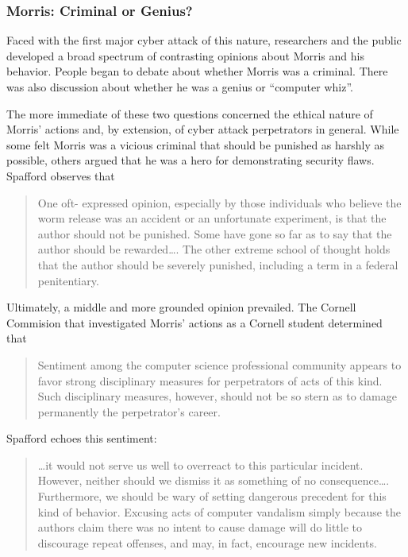 \subsubsection*{Morris: Criminal or Genius?}
Faced with the first major cyber attack of this nature, researchers and the
public developed a broad spectrum of contrasting opinions about Morris and his
behavior. People began to debate about whether Morris was a criminal.
There was also discussion about whether he was a genius or ``computer whiz''. 

The more immediate of these two questions concerned the ethical
nature of Morris' actions and, by extension, of cyber attack perpetrators in
general. While some felt Morris was a vicious criminal that should be
punished as harshly as possible, others argued that he was a hero for
demonstrating security flaws. Spafford\cite{spafford_crisis_1989} observes that 
\begin{quote}
One oft- expressed opinion, especially by those individuals who believe the
worm release was an accident or an unfortunate experiment, is that the author
should not be punished. Some have gone so far as to say that the author should
be rewarded\ldots.
The other extreme school of thought holds that the author should be severely
punished, including a term in a federal penitentiary.
\end{quote}

Ultimately, a middle and more grounded opinion prevailed. The Cornell
Commision\cite{eisenberg_cornell_1989} that investigated Morris' actions as a
Cornell student determined that
\begin{quote}
Sentiment among the computer science professional community appears to favor
strong disciplinary measures for perpetrators of acts of this kind. Such
disciplinary measures, however, should not be so stern as to damage permanently
the perpetrator's career.
\end{quote}

Spafford\cite{spafford_crisis_1989} echoes this sentiment:
\begin{quote}
\ldots it would not serve us well to overreact to this particular incident.
However, neither should we dismiss it as something of no consequence\ldots.
Furthermore, we should be wary of setting dangerous precedent for this kind of
behavior. Excusing acts of computer vandalism simply because the authors claim
there was no intent to cause damage will do little to discourage repeat
offenses, and may, in fact, encourage new incidents.
\end{quote}


